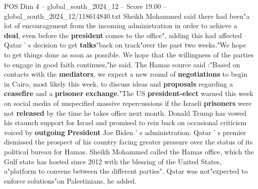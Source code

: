 \begin{textsample}{POS Dim 4 – global\_south\_2024\_12 – Score 19.00 – global\_south\_2024\_12/118614840.txt}
Sheikh Mohammed said there had been"a lot of encouragement from the incoming administration in order to achieve a \textbf{deal}, even before the \textbf{president} comes to the office", adding this had affected Qatar ' s decision to get \textbf{talks}"back on track"over the past two weeks."We hope to get things done as soon as possible.
We hope that the willingness of the parties to engage in good faith continues,"he said.
The Hamas source said :"Based on contacts with the \textbf{mediators}, we expect a new round of \textbf{negotiations} to begin in Cairo, most likely this week, to discuss ideas and \textbf{proposals} regarding a \textbf{ceasefire} and a \textbf{prisoner} \textbf{exchange}."The US \textbf{president-elect} warned this week on social media of unspecified massive repercussions if the Israeli \textbf{prisoners} were not \textbf{released} by the time he takes office next month.
Donald Trump has vowed his staunch support for Israel and promised to rein back on occasional criticism voiced by \textbf{outgoing} \textbf{President} Joe Biden ' s administration.
Qatar ' s premier dismissed the prospect of his country facing greater pressure over the status of its political bureau for Hamas.
Sheikh Mohammed called the Hamas office, which the Gulf state has hosted since 2012 with the blessing of the United States, a"platform to convene between the different parties".
Qatar was not"expected to enforce solutions"on Palestinians, he added.

\end{textsample}
